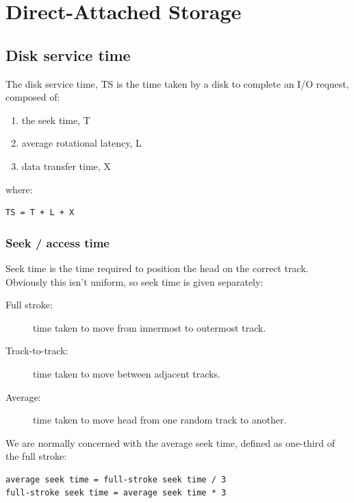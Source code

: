 \chapter{Direct-Attached Storage}
\label{ch:direct-attached-storage}

\section{Disk service time}
\label{sec:disk-service-time}

The disk service time, TS is the time taken by a disk to complete an I/O
request, composed of:

\begin{enumerate}
\def\labelenumi{\arabic{enumi}.}

\item
  the seek time, T
\item
  average rotational latency, L
\item
  data transfer time, X
\end{enumerate}

where:

\begin{verbatim}
TS = T + L + X
\end{verbatim}

\subsection{Seek / access time}\label{seek-access-time}

Seek time is the time required to position the head on the correct
track. Obviously this isn't uniform, so seek time is given separately:

\begin{description}
\item[Full stroke:]
time taken to move from innermost to outermost track.
\item[Track-to-track:]
time taken to move between adjacent tracks.
\item[Average:]
time taken to move head from one random track to another.
\end{description}

We are normally concerned with the average seek time, defined as
one-third of the full stroke:

\begin{verbatim}
average seek time = full-stroke seek time / 3
full-stroke seek time = average seek time * 3
\end{verbatim}

